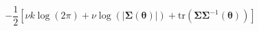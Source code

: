 \begin{equation}
    -
    \frac{1}{2}
    \left[
    \nu
    k
    \log
    \left(
    2
    \pi
    \right)
    +
    \nu
    \log
    \left(
    \left|
    \boldsymbol{\Sigma}
    \left(
    \boldsymbol{\theta}
    \right)
    \right|
    \right)
    +
    \mathrm{tr}
    \left(
    \boldsymbol{\Sigma}
    \boldsymbol{\Sigma}^{-1}
    \left(
    \boldsymbol{\theta}
    \right)
    \right)
    \right]
    \label{eq:multiNorm-wishart-discrepancy}
\end{equation}
